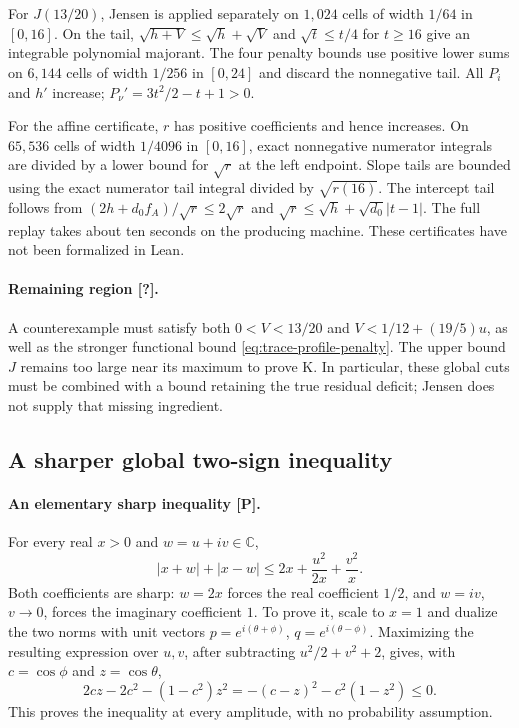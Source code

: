 For $J(13/20)$, Jensen is applied separately on $1{,}024$ cells of width
$1/64$ in $[0,16]$. On the tail,
$\sqrt{h+V}\le\sqrt h+\sqrt V$ and
$\sqrt t\le t/4$ for $t\ge16$ give an integrable polynomial majorant.
The four penalty bounds use positive lower sums on $6{,}144$ cells
of width $1/256$ in $[0,24]$ and discard the nonnegative tail. All
$P_i$ and $h'$ increase; $P_\nu'=3t^2/2-t+1>0$.

For the affine certificate, $r$ has positive coefficients and hence
increases. On $65{,}536$ cells of width $1/4096$ in $[0,16]$, exact
nonnegative numerator integrals are divided by a lower bound for
$\sqrt r$ at the left endpoint. Slope tails are bounded using the
exact numerator tail integral divided by $\sqrt{r(16)}$. The intercept
tail follows from
$(2h+d_0f_A)/\sqrt r\le2\sqrt r$ and
$\sqrt r\le\sqrt h+\sqrt{d_0}|t-1|$.
The full replay takes about ten seconds on the producing machine.
These certificates have not been formalized in Lean.

\paragraph{Remaining region [?].}
A counterexample must satisfy both
$0<V<13/20$ and $V<1/12+(19/5)u$, as well as the stronger functional
bound \eqref{eq:trace-profile-penalty}. The upper bound $J$ remains too
large near its maximum to prove K. In particular, these global cuts
must be combined with a bound retaining the true residual deficit;
Jensen does not supply that missing ingredient.

\subsection{A sharper global two-sign inequality}
\label{sec:anisotropic-two-sign-global}
\paragraph{An elementary sharp inequality [P].}
For every real $x>0$ and $w=u+iv\in\mathbb C$,
\begin{equation}
 |x+w|+|x-w|\le2x+\frac{u^2}{2x}+\frac{v^2}{x}.
 \label{eq:anisotropic-two-sign}
\end{equation}
Both coefficients are sharp: $w=2x$ forces the real coefficient $1/2$,
and $w=iv$, $v\to0$, forces the imaginary coefficient $1$.
To prove it, scale to $x=1$ and dualize the two norms with unit vectors
$p=e^{i(\theta+\phi)}$, $q=e^{i(\theta-\phi)}$.
Maximizing the resulting expression over $u,v$, after subtracting
$u^2/2+v^2+2$, gives, with $c=\cos\phi$ and $z=\cos\theta$,
\[
 2cz-2c^2-(1-c^2)z^2=-(c-z)^2-c^2(1-z^2)\le0.
\]
This proves the inequality at every amplitude, with no probability assumption.

